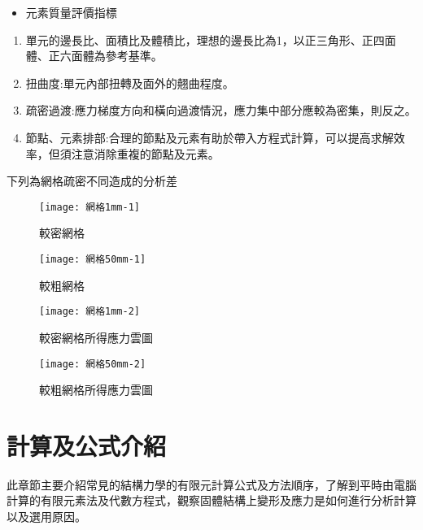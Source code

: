 \begin{itemize}
\item 元素質量評價指標
\end{itemize}
\begin{enumerate}
\item 單元的邊長比、面積比及體積比，理想的邊長比為1，以正三角形、正四面體、正六面體為參考基準。
\item 扭曲度:單元內部扭轉及面外的翹曲程度。
\item 疏密過渡:應力梯度方向和橫向過渡情況，應力集中部分應較為密集，則反之。
\item 節點、元素排部:合理的節點及元素有助於帶入方程式計算，可以提高求解效率，但須注意消除重複的節點及元素。
\end{enumerate}

下列為網格疏密不同造成的分析差\

\begin{figure}[htbp]
  \centering
  \begin{minipage}{0.45\textwidth}
    \centering
    \texttt{[image: 網格1mm-1]}
    \caption{較密網格}
    \label{網格1mm-1}
  \end{minipage}
  \hfill
  \begin{minipage}{0.45\textwidth}
    \centering
    \texttt{[image: 網格50mm-1]}
    \caption{較粗網格}
    \label{網格1mm-2}
  \end{minipage}
  
  \begin{minipage}{0.45\textwidth}
    \centering
    \texttt{[image: 網格1mm-2]}
    \caption{較密網格所得應力雲圖}
    \label{網格50mm-1}
  \end{minipage}
  \hfill
  \begin{minipage}{0.45\textwidth}
    \centering
    \texttt{[image: 網格50mm-2]}
    \caption{較粗網格所得應力雲圖}
    \label{網格50mm-2}
  \end{minipage}
\end{figure}
\newpage

\section{計算及公式介紹}
此章節主要介紹常見的結構力學的有限元計算公式及方法順序，了解到平時由電腦計算的有限元素法及代數方程式，觀察固體結構上變形及應力是如何進行分析計算以及選用原因。\\

